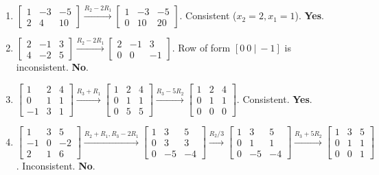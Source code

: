\documentclass[12pt]{article}
\begin{document}
\begin{enumerate}
    \item $\begin{bmatrix} 1 & -3 & -5 \\ 2 & 4 & 10 \end{bmatrix} \xrightarrow{R_2-2R_1} \begin{bmatrix} 1 & -3 & -5 \\ 0 & 10 & 20 \end{bmatrix}$. Consistent ($x_2=2, x_1=1$). \textbf{Yes}.
    \item $\begin{bmatrix} 2 & -1 & 3 \\ 4 & -2 & 5 \end{bmatrix} \xrightarrow{R_2-2R_1} \begin{bmatrix} 2 & -1 & 3 \\ 0 & 0 & -1 \end{bmatrix}$. Row of form $[0 \ 0 \ | \ -1]$ is inconsistent. \textbf{No}.
    \item $\begin{bmatrix} 1 & 2 & 4 \\ 0 & 1 & 1 \\ -1 & 3 & 1 \end{bmatrix} \xrightarrow{R_3+R_1} \begin{bmatrix} 1 & 2 & 4 \\ 0 & 1 & 1 \\ 0 & 5 & 5 \end{bmatrix} \xrightarrow{R_3-5R_2} \begin{bmatrix} 1 & 2 & 4 \\ 0 & 1 & 1 \\ 0 & 0 & 0 \end{bmatrix}$. Consistent. \textbf{Yes}.
    \item $\begin{bmatrix} 1 & 3 & 5 \\ -1 & 0 & -2 \\ 2 & 1 & 6 \end{bmatrix} \xrightarrow{R_2+R_1, R_3-2R_1} \begin{bmatrix} 1 & 3 & 5 \\ 0 & 3 & 3 \\ 0 & -5 & -4 \end{bmatrix} \xrightarrow{R_2/3} \begin{bmatrix} 1 & 3 & 5 \\ 0 & 1 & 1 \\ 0 & -5 & -4 \end{bmatrix} \xrightarrow{R_3+5R_2} \begin{bmatrix} 1 & 3 & 5 \\ 0 & 1 & 1 \\ 0 & 0 & 1 \end{bmatrix}$. Inconsistent. \textbf{No}.

\end{enumerate}
\end{document}
